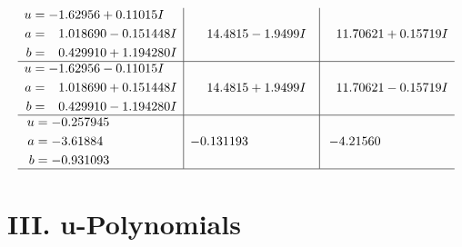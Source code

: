 \documentclass[1p]{elsarticle_modified}
\theoremstyle{definition}
\begin{document}
$$\begin{array}{c|c|c}
\begin{aligned}
u &= -1.62956 + 0.11015 I \\
a &= \phantom{-}1.018690 - 0.151448 I \\
b &= \phantom{-}0.429910 + 1.194280 I\end{aligned}
 & \phantom{-}14.4815 - 1.9499 I & \phantom{-}11.70621 + 0.15719 I \\ \hline\begin{aligned}
u &= -1.62956 - 0.11015 I \\
a &= \phantom{-}1.018690 + 0.151448 I \\
b &= \phantom{-}0.429910 - 1.194280 I\end{aligned}
 & \phantom{-}14.4815 + 1.9499 I & \phantom{-}11.70621 - 0.15719 I \\ \hline\begin{aligned}
u &= -0.257945\phantom{ +0.000000I} \\
a &= -3.61884\phantom{ +0.000000I} \\
b &= -0.931093\phantom{ +0.000000I}\end{aligned}
 & -0.131193\phantom{ +0.000000I} & -4.21560\phantom{ +0.000000I}\\
 \hline 
 \end{array}$$\newpage
\newpage\renewcommand{\arraystretch}{1}
\centering \section*{ III. u-Polynomials}
\end{document}
